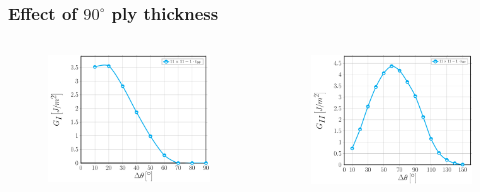 \documentclass[first,firstsupp,lastsupp,last,hyperref,table]{ETHclass}
\begin{document}
\begin{frame}
\frametitle{\vspace{0.2cm}\small Effect of $90^{\circ}$ ply thickness}
\vspace{-.75cm}
\centering
\begin{columns}[c]
\centering
\begin{column}{0.5\textwidth}
\centering
\begin{figure}
\centering
\includegraphics[width=\columnwidth]{nxk-1-vf60-GI-thick.pdf}
\end{figure}
\end{column}
\begin{column}{0.5\textwidth}
\centering
\begin{figure}
\centering
\includegraphics[width=\columnwidth]{nxk-1-vf60-GII-thick.pdf}

\end{figure}
\end{column}
\end{columns}
\end{frame}
\end{document}
